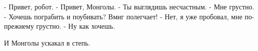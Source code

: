 - Привет, робот.
- Привет, Монголы.
- Ты выглядишь несчастным.
- Мне грустно.
- Хочешь пограбить и поубивать? Вмиг полегчает!
- Нет, я уже пробовал, мне по-прежнему грустно.
- Ну как хочешь.

И Монголы ускакал в степь.